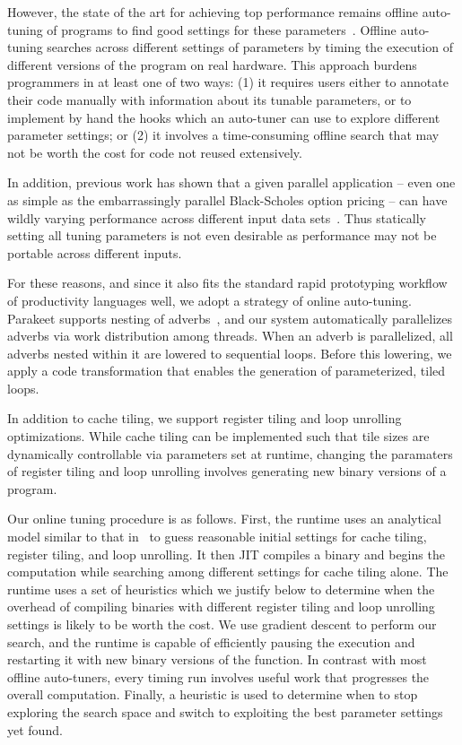 \documentclass[preprint,9pt]{sigplanconf}
\begin{document}
However, the state of the art for achieving top performance remains offline auto-tuning of programs to find good settings for these parameters~\cite{Asan06}.  Offline auto-tuning searches across different settings of parameters by timing the execution of different versions of the program on real hardware.  This approach burdens programmers in at least one of two ways: (1) it requires users either to annotate their code manually with information about its tunable parameters, or to implement by hand the hooks which an auto-tuner can use to explore different parameter settings; or (2) it involves a time-consuming offline search that may not be worth the cost for code not reused extensively.

In addition, previous work has shown that a given parallel application -- even one as simple as the embarrassingly parallel Black-Scholes option pricing -- can have wildly varying performance across different input data sets~\cite{Rama12}.  Thus statically setting all tuning parameters is not even desirable as performance may not be portable across different inputs.

For these reasons, and since it also fits the standard rapid prototyping workflow of productivity languages well, we adopt a strategy of online auto-tuning.  Parakeet supports nesting of adverbs~\cite{Blel94}, and our system automatically parallelizes adverbs via work distribution among threads.  When an adverb is parallelized, all adverbs nested within it are lowered to sequential loops.  Before this lowering, we apply a code transformation that enables the generation of parameterized, tiled loops.

In addition to cache tiling, we support register tiling and loop unrolling optimizations.  While cache tiling can be implemented such that tile sizes are dynamically controllable via parameters set at runtime, changing the paramaters of register tiling and loop unrolling involves generating new binary versions of a program.

Our online tuning procedure is as follows.  First, the runtime uses an analytical model similar to that in~\cite{Shir12} to guess reasonable initial settings for cache tiling, register tiling, and loop unrolling.  It then JIT compiles a binary and begins the computation while searching among different settings for cache tiling alone.  The runtime uses a set of heuristics which we justify below to determine when the overhead of compiling binaries with different register tiling and loop unrolling settings is likely to be worth the cost.  We use gradient descent to perform our search, and the runtime is capable of efficiently pausing the execution and restarting it with new binary versions of the function.  In contrast with most offline auto-tuners, every timing run involves useful work that progresses the overall computation.  Finally, a heuristic is used to determine when to stop exploring the search space and switch to exploiting the best parameter settings yet found.
\end{document}
